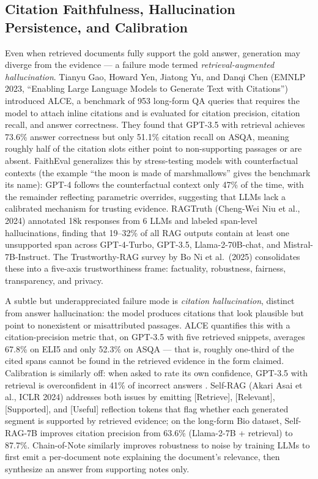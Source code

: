 \documentclass{article}
\begin{document}
\subsection{Citation Faithfulness, Hallucination Persistence, and Calibration}\label{citation-faithfulness-hallucination-persistence-and-calibration}

Even when retrieved documents fully support the gold answer, generation may diverge from the evidence --- a failure mode termed \emph{retrieval-augmented hallucination}. Tianyu Gao, Howard Yen, Jiatong Yu, and Danqi Chen (EMNLP 2023, ``Enabling Large Language Models to Generate Text with Citations'') introduced ALCE, a benchmark of 953 long-form QA queries that requires the model to attach inline citations and is evaluated for citation precision, citation recall, and answer correctness. They found that GPT-3.5 with retrieval achieves 73.6\% answer correctness but only 51.1\% citation recall on ASQA, meaning roughly half of the citation slots either point to non-supporting passages or are absent. FaithEval \citep{ming2024faithevalcanyourla} generalizes this by stress-testing models with counterfactual contexts (the example ``the moon is made of marshmallows'' gives the benchmark its name): GPT-4 follows the counterfactual context only 47\% of the time, with the remainder reflecting parametric overrides, suggesting that LLMs lack a calibrated mechanism for trusting evidence. RAGTruth (Cheng-Wei Niu et al., 2024) annotated 18k responses from 6 LLMs and labeled span-level hallucinations, finding that 19--32\% of all RAG outputs contain at least one unsupported span across GPT-4-Turbo, GPT-3.5, Llama-2-70B-chat, and Mistral-7B-Instruct. The Trustworthy-RAG survey by Bo Ni et al.~(2025) consolidates these into a five-axis trustworthiness frame: factuality, robustness, fairness, transparency, and privacy.

A subtle but underappreciated failure mode is \emph{citation hallucination}, distinct from answer hallucination: the model produces citations that look plausible but point to nonexistent or misattributed passages. ALCE quantifies this with a citation-precision metric that, on GPT-3.5 with five retrieved snippets, averages 67.8\% on ELI5 and only 52.3\% on ASQA --- that is, roughly one-third of the cited spans cannot be found in the retrieved evidence in the form claimed. Calibration is similarly off: when asked to rate its own confidence, GPT-3.5 with retrieval is overconfident in 41\% of incorrect answers \citep{ming2024faithevalcanyourla}. Self-RAG (Akari Asai et al., ICLR 2024) addresses both issues by emitting {[}Retrieve{]}, {[}Relevant{]}, {[}Supported{]}, and {[}Useful{]} reflection tokens that flag whether each generated segment is supported by retrieved evidence; on the long-form Bio dataset, Self-RAG-7B improves citation precision from 63.6\% (Llama-2-7B + retrieval) to 87.7\%. Chain-of-Note \citep{yu2023chainofnoteenhanci} similarly improves robustness to noise by training LLMs to first emit a per-document note explaining the document's relevance, then synthesize an answer from supporting notes only.
\end{document}
